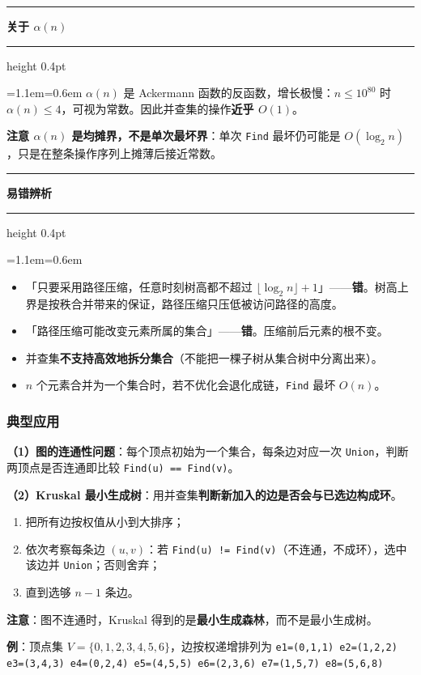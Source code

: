 \documentclass[11pt,openany,UTF8]{ctexbook}
\newcommand{\callouthead}[2]{%
  \par\addvspace{7pt}\noindent
  {\color{#1}\rule[-0.15em]{3pt}{1.05em}}\hspace{0.5em}%
  {\bfseries\color{#1}#2}\par\nobreak\vspace{-0.35em}%
  {\color{rulesep}\hrule height 0.4pt}\nobreak\vspace{0.45em}%
  \begingroup\small\setlength{\parindent}{0pt}%
  \leftskip=1.1em\rightskip=0.6em\noindent\ignorespaces}
\newcommand{\calloutend}{\par\endgroup\addvspace{7pt}}
\newenvironment{callkey}[1]{\callouthead{keybar}{#1}}{\calloutend}
\newenvironment{callwarn}[1]{\callouthead{warnbar}{#1}}{\calloutend}
\begin{document}
\begin{callkey}{关于 $\alpha(n)$}
$\alpha(n)$ 是 Ackermann 函数的反函数，增长极慢：$n\le10^{80}$ 时 $\alpha(n)\le4$，可视为常数。因此并查集的操作\textbf{近乎 $O(1)$}。

\textbf{注意 $\alpha(n)$ 是均摊界，不是单次最坏界}：单次 \texttt{Find} 最坏仍可能是 $O(\log_2 n)$，只是在整条操作序列上摊薄后接近常数。

\end{callkey}

\begin{callwarn}{易错辨析}
\begin{itemize}
\item 「只要采用路径压缩，任意时刻树高都不超过 $\lfloor\log_2 n\rfloor+1$」——\textbf{错}。树高上界是按秩合并带来的保证，路径压缩只压低被访问路径的高度。
\item 「路径压缩可能改变元素所属的集合」——\textbf{错}。压缩前后元素的根不变。
\item 并查集\textbf{不支持高效地拆分集合}（不能把一棵子树从集合树中分离出来）。
\item $n$ 个元素合并为一个集合时，若不优化会退化成链，\texttt{Find} 最坏 $O(n)$。
\end{itemize}
\end{callwarn}

\subsubsection{典型应用}

\textbf{（1）图的连通性问题}：每个顶点初始为一个集合，每条边对应一次 \texttt{Union}，判断两顶点是否连通即比较 \texttt{Find(u)\allowbreak{} =\allowbreak{}=\allowbreak{} Find(v)\allowbreak{}}。

\textbf{（2）Kruskal 最小生成树}：用并查集\textbf{判断新加入的边是否会与已选边构成环}。

\begin{enumerate}
\item 把所有边按权值从小到大排序；
\item 依次考察每条边 $(u,v)$：若 \texttt{Find(u)\allowbreak{} !=\allowbreak{} Find(v)\allowbreak{}}（不连通，不成环），选中该边并 \texttt{Union}；否则舍弃；
\item 直到选够 $n-1$ 条边。
\end{enumerate}
\textbf{注意}：图不连通时，Kruskal 得到的是\textbf{最小生成森林}，而不是最小生成树。

\textbf{例}：顶点集 $V=\{0,1,2,3,4,5,6\}$，边按权递增排列为 \texttt{e1=\allowbreak{}(0,\allowbreak{}1,\allowbreak{}1)\allowbreak{} e2=\allowbreak{}(1,\allowbreak{}2,\allowbreak{}2)\allowbreak{} e3=\allowbreak{}(3,\allowbreak{}4,\allowbreak{}3)\allowbreak{} e4=\allowbreak{}(0,\allowbreak{}2,\allowbreak{}4)\allowbreak{} e5=\allowbreak{}(4,\allowbreak{}5,\allowbreak{}5)\allowbreak{} e6=\allowbreak{}(2,\allowbreak{}3,\allowbreak{}6)\allowbreak{} e7=\allowbreak{}(1,\allowbreak{}5,\allowbreak{}7)\allowbreak{} e8=\allowbreak{}(5,\allowbreak{}6,\allowbreak{}8)\allowbreak{}}
\end{document}
